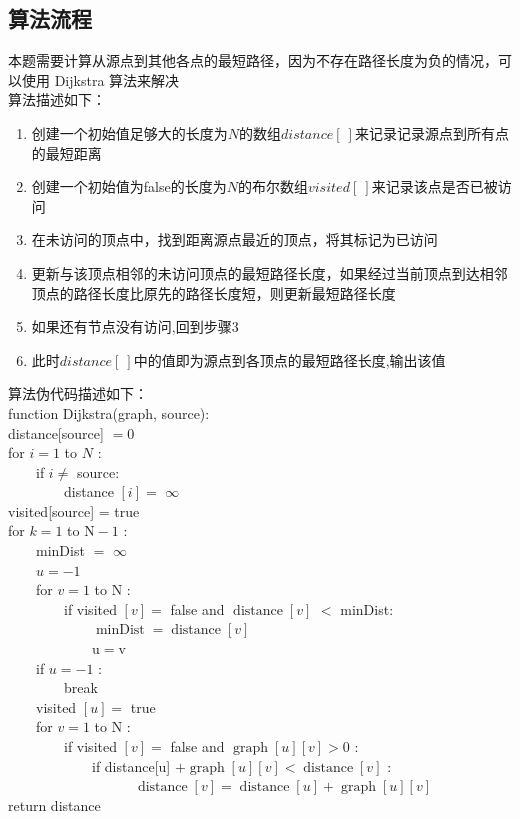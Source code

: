 \documentclass[UTF8,a4paperdui, %
]{ctexart}
\begin{document}
\subsection{算法流程}
本题需要计算从源点到其他各点的最短路径，因为不存在路径长度为负的情况，可以使用 Dijkstra 算法来解决\\
算法描述如下：
\begin{enumerate}
    \item 创建一个初始值足够大的长度为$N$的数组$distance[\ ]$来记录记录源点到所有点的最短距离
    \item 创建一个初始值为false的长度为$N$的布尔数组$visited[\ ]$来记录该点是否已被访问
    \item 在未访问的顶点中，找到距离源点最近的顶点，将其标记为已访问
    \item 更新与该顶点相邻的未访问顶点的最短路径长度，如果经过当前顶点到达相邻顶点的路径长度比原先的路径长度短，则更新最短路径长度
    \item 如果还有节点没有访问,回到步骤3
    \item 此时$distance[\ ]$中的值即为源点到各顶点的最短路径长度,输出该值
\end{enumerate}
算法伪代码描述如下：\\
function Dijkstra(graph, source):\\
distance[source] $=0$\\
for $i=1$ to $N$ :\\
　　if $i \neq$ source:\\
　　　　distance $[i]=$ $\infty$\\
visited[source] = true\\
for $k=1$ to $\mathrm{N}-1$ :\\
　　minDist $=$ $\infty$\\
　　$u=-1$\\
　　for $v=1$ to $\mathrm{N}$ :\\
　　　　if visited $[v]=$ false and $\operatorname{distance}[v]$ $<$ minDist:\\
　　　　　　$\operatorname{minDist}=\operatorname{distance}[v]$\\
　　　　　　$\mathrm{u}=\mathrm{v}$\\
　　if $u=-1$ :\\
　　　　break\\
　　visited $[u]=$ true\\
　　for $v=1$ to $\mathrm{N}$ :\\
　　　　if visited $[v]=$ false and $\operatorname{graph}[u][v]>0$ :\\
　　　　　　if distance[u] $+\operatorname{graph}[u][v]<\operatorname{distance}[v]$ :\\
　　　　　　　　　$\operatorname{distance}[v]=\operatorname{distance}[u]+\operatorname{graph}[u][v]$\\
return distance
\end{document}
